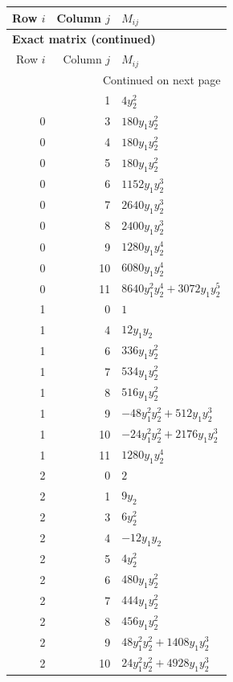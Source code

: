 \documentclass[10pt,a4paper]{article}
\begin{document}
{\small\setlength{\tabcolsep}{7pt}\begin{longtable}{rrp{125mm}}
\toprule Row $i$ & Column $j$ & $M_{ij}$\\\midrule\endfirsthead
\multicolumn{3}{l}{\textbf{Exact matrix (continued)}}\\
\toprule Row $i$ & Column $j$ & $M_{ij}$\\\midrule\endhead
\midrule\multicolumn{3}{r}{Continued on next page}\\\endfoot\bottomrule\endlastfoot
0 & 1 & $4 y_{2}^{2}$\\
0 & 3 & $180 y_{1} y_{2}^{2}$\\
0 & 4 & $180 y_{1} y_{2}^{2}$\\
0 & 5 & $180 y_{1} y_{2}^{2}$\\
0 & 6 & $1152 y_{1} y_{2}^{3}$\\
0 & 7 & $2640 y_{1} y_{2}^{3}$\\
0 & 8 & $2400 y_{1} y_{2}^{3}$\\
0 & 9 & $1280 y_{1} y_{2}^{4}$\\
0 & 10 & $6080 y_{1} y_{2}^{4}$\\
0 & 11 & $8640 y_{1}^{2} y_{2}^{4} + 3072 y_{1} y_{2}^{5}$\\
1 & 0 & $1$\\
1 & 4 & $12 y_{1} y_{2}$\\
1 & 6 & $336 y_{1} y_{2}^{2}$\\
1 & 7 & $534 y_{1} y_{2}^{2}$\\
1 & 8 & $516 y_{1} y_{2}^{2}$\\
1 & 9 & $- 48 y_{1}^{2} y_{2}^{2} + 512 y_{1} y_{2}^{3}$\\
1 & 10 & $- 24 y_{1}^{2} y_{2}^{2} + 2176 y_{1} y_{2}^{3}$\\
1 & 11 & $1280 y_{1} y_{2}^{4}$\\
2 & 0 & $2$\\
2 & 1 & $9 y_{2}$\\
2 & 3 & $6 y_{2}^{2}$\\
2 & 4 & $- 12 y_{1} y_{2}$\\
2 & 5 & $4 y_{2}^{2}$\\
2 & 6 & $480 y_{1} y_{2}^{2}$\\
2 & 7 & $444 y_{1} y_{2}^{2}$\\
2 & 8 & $456 y_{1} y_{2}^{2}$\\
2 & 9 & $48 y_{1}^{2} y_{2}^{2} + 1408 y_{1} y_{2}^{3}$\\
2 & 10 & $24 y_{1}^{2} y_{2}^{2} + 4928 y_{1} y_{2}^{3}$\\

\end{longtable}}
\end{document}
